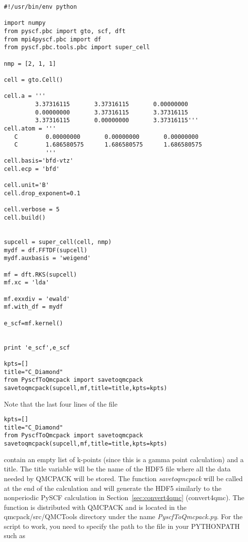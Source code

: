 \begin{lstlisting}[style=Python,caption=Example PySCF input for single k-point calculation for a $2 \times 1 \times 1$ carbon supercell.]
#!/usr/bin/env python

import numpy
from pyscf.pbc import gto, scf, dft
from mpi4pyscf.pbc import df 
from pyscf.pbc.tools.pbc import super_cell

nmp = [2, 1, 1]

cell = gto.Cell()

cell.a = '''
         3.37316115       3.37316115       0.00000000
         0.00000000       3.37316115       3.37316115
         3.37316115       0.00000000       3.37316115'''
cell.atom = '''  
   C        0.00000000       0.00000000       0.00000000
   C        1.686580575      1.686580575      1.686580575 
            '''
cell.basis='bfd-vtz'
cell.ecp = 'bfd'

cell.unit='B'
cell.drop_exponent=0.1

cell.verbose = 5
cell.build()


supcell = super_cell(cell, nmp)
mydf = df.FFTDF(supcell)
mydf.auxbasis = 'weigend'

mf = dft.RKS(supcell)
mf.xc = 'lda'

mf.exxdiv = 'ewald'
mf.with_df = mydf

e_scf=mf.kernel()


print 'e_scf',e_scf

kpts=[]
title="C_Diamond"
from PyscfToQmcpack import savetoqmcpack
savetoqmcpack(supcell,mf,title=title,kpts=kpts)

\end{lstlisting}

Note that the last four lines of the file
\begin{lstlisting}[style=Python]
kpts=[]
title="C_Diamond"
from PyscfToQmcpack import savetoqmcpack
savetoqmcpack(supcell,mf,title=title,kpts=kpts)
\end{lstlisting}

contain an empty list of k-points (since this is a gamma point
calculation) and a title. The title variable will be the name of the
HDF5 file where all the data needed by QMCPACK will be stored.  The
function \textit{savetoqmcpack} will be called at the end of the
calculation and will generate the HDF5 similarly to the nonperiodic
PySCF calculation in Section~\ref{sec:convert4qmc} (convert4qmc). The
function is distributed with QMCPACK and is located in the
qmcpack/src/QMCTools directory under the name
\textit{PyscfToQmcpack.py}. For the script to work, you need
to specify the path to the file in your PYTHONPATH such as

